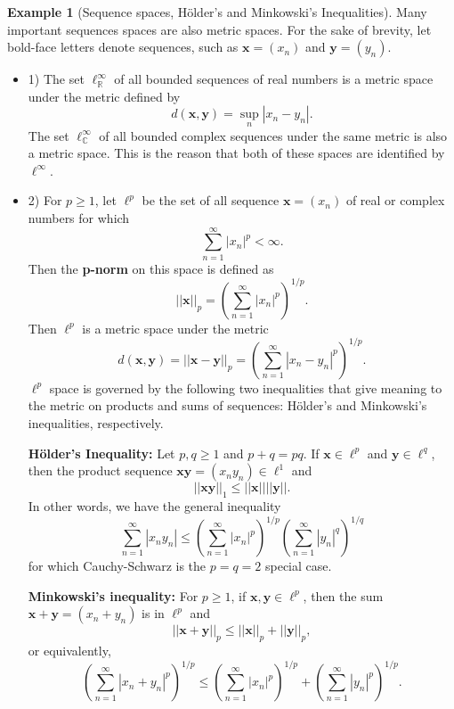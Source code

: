 \documentclass{article}
\theoremstyle{definition}
\newtheorem{exmp}[thm]{Example}
\theoremstyle{remark}
\numberwithin{equation}{section}
\begin{document}
\begin{exmp}[Sequence spaces, H\"{o}lder's and Minkowski's Inequalities]
Many important sequences spaces are also metric spaces. For the sake of brevity, let bold-face letters denote sequences, such as $\textbf{x} = (x_n)$ and $\textbf{y} = (y_n).$ 
\begin{itemize}
    \item 1) The set $\ell ^{\infty} _{\mathbb{R}}$ of all bounded sequences of real numbers is a metric space under the metric defined by 
    $$d( \textbf{x}, \textbf{y}) = \sup _{n} | x_n - y_n|.$$
    The set $\ell ^{\infty} _{\mathbb{C}}$ of all bounded complex sequences under the same metric is also a metric space. This is the reason that both of these spaces are identified by $\ell ^ \infty$. 
    \item 2) For $p \geq 1$, let $\ell ^p$ be the set of all sequence $\textbf{x} = (x_n)$ of real or complex numbers for which 
    $$\sum ^\infty _{ n =1} |x_n| ^p < \infty. $$
    Then the \textbf{p-norm} on this space is defined as
    $$||\textbf{x} || _p = \left( \sum ^\infty _{n = 1} |x_n| ^p\right) ^{1/p} .$$
    Then $\ell ^p$ is a metric space under the metric 
    $$d(\textbf{x}, \textbf{y}) = || \textbf{x} - \textbf{y}||_p = \left( \sum ^\infty _{n = 1} |x_n - y_n |^p\right) ^{1/p}.$$
    $\ell^p$ space is governed by the following two inequalities that give meaning to the metric on products and sums of sequences: H\"{o}lder's and Minkowski's inequalities, respectively. 
    
    \textbf{H\"{o}lder's Inequality: } Let $p, q \geq 1$ and $p+q = pq$. If $\textbf{x} \in \ell ^p$ and $\textbf{y} \in \ell ^q$, then the product sequence $\textbf{xy} = (x_ny_n) \in \ell ^1$ and 
    $$|| \textbf{xy} || _1 \leq ||\textbf{x}|| ||\textbf{y}||.$$
    In other words, we have the general inequality 
    $$\sum _{n = 1} ^\infty |x_n y_n| \leq \left( \sum _{n=1}^\infty |x_n|^p\right)^{1/p} \left( \sum _{n = 1} ^\infty |y_n|^q \right) ^{1/q} $$
    for which Cauchy-Schwarz is the $p=q=2$ special case. 
    
    \textbf{Minkowski's inequality:} For $p \geq 1$, if $\textbf{x},\textbf{y} \in \ell ^p$, then the sum $\textbf{x} + \textbf{y} = (x_n + y_n)$ is in $\ell ^p$ and 
    $$||\textbf{x} + \textbf{y} ||_p \leq || \textbf{x} || _p + || \textbf{y}|| _p,$$
    or equivalently, 
    $$\left( \sum _{n = 1} ^\infty |x_n +  y_n|^p \right) ^{1/p} \leq \left( \sum _{n=1}^\infty |x_n|^p\right)^{1/p} + \left( \sum _{n = 1} ^\infty |y_n|^p \right) ^{1/p}.$$
    
\end{itemize}
\end{exmp}
\end{document}
